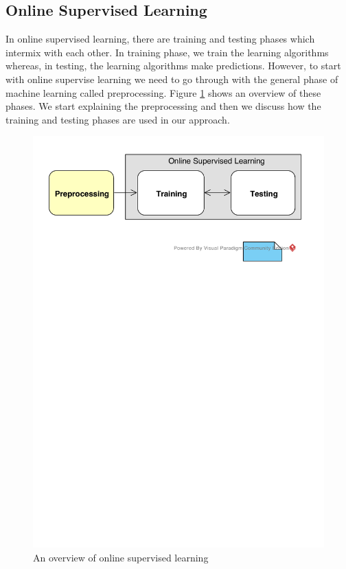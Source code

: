 \documentclass[a4paper,12pt]{article}
\begin{document}
\subsection{Online Supervised Learning}
In online supervised learning, there are training and testing phases which intermix with each other. In training phase, we train the learning algorithms whereas, in testing, the learning algorithms make predictions. However, to start with online supervise learning we need to go through with the general phase of machine learning called preprocessing. Figure \ref{OnlineSupervisedLearning} shows an overview of these phases. We start explaining the preprocessing and then we discuss how the training and testing phases are used in our approach.
\begin{figure}[H]
	\centering
	\includegraphics[keepaspectratio, width=\linewidth]{figures/OnlineSupervisedLearning.pdf}
	\caption{An overview of online supervised learning}
	\label{OnlineSupervisedLearning}
\end{figure}
\end{document}
